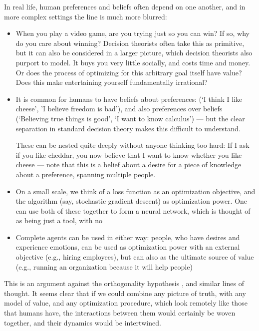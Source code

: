 \documentclass{article}
\begin{document}
	
	In real life, human preferences and beliefs often depend on one another, and in more complex settings the line is much more blurred:
	\begin{itemize}
		\item When you play a video game, are you trying just so you can win? If so, why do you care about winning? Decision theorists often take this as primitive, but it can also be considered in a larger picture, which decision theorists also purport to model. It buys you very little socially, and costs time and money. Or does the process of optimizing for this arbitrary goal itself have value? Does this make entertaining yourself fundamentally irrational?
		\item It is common for humans to have beliefs about preferences: (`I think I like cheese', 'I believe freedom is bad'), and also preferences over beliefs (`Believing true things is good', `I want to know calculus') --- but the clear separation in standard decision theory makes this difficult to understand. 
		
		These can be nested quite deeply without anyone thinking too hard: If I ask if you like cheddar, you now believe that I want to know whether you like cheese --- note that this is a belief about a desire for a piece of knowledge about a preference, spanning multiple people.
		
		\item On a small scale, we think of a loss function as an optimization objective, and the algorithm (say, stochastic gradient descent) as optimization power. One can use both of these together to form a neural network, which is thought of as being just a tool, with no
		
		\item Complete agents can be used in either way: people, who have desires and experience emotions, can be used as optimization power with an external objective (e.g., hiring employees), but can also as the ultimate source of value (e.g., running an organization because it will help people)
	\end{itemize}
	This is an argument against the orthogonality hypothesis \cite{orthogonality}, and similar lines of thought. It seems clear that if we could combine any picture of truth, with any model of value, and any optimization procedure, which look remotely like those that humans have, the interactions between them would certainly be woven together, and their dynamics would be intertwined.
		
\end{document}
